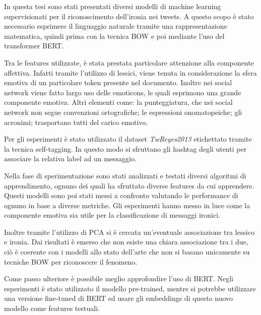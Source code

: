 \documentclass[oneside]{book}
\begin{document}
In questa tesi sono stati presentati diversi modelli di machine learning supervisionati per il riconoscimento dell'ironia nei tweets. A questo scopo è stato necessario esprimere il linguaggio naturale tramite una rappresentazione matematica, quindi prima con la tecnica BOW e poi mediante l'uso del transformer BERT.

Tra le features utilizzate, è stata prestata particolare attenzione alla componente affettiva. Infatti tramite l'utilizzo di lessici, viene tenuta in considerazione la sfera emotiva di un particolare token presente nel documento. Inoltre nei social network viene fatto largo uso delle emoticons, le quali esprimono una grande componente emotiva. Altri elementi come: la punteggiatura, che nei social network non segue convenzioni ortografiche; le espressioni onomatopeiche; gli acronimi; trasportano tutti del carico emotivo.

Per gli esperimenti è stato utilizzato il dataset \textit{TwReyes2013} etichettato tramite la tecnica self-tagging. In questo modo si sfruttano gli hashtag degli utenti per associare la relativa label ad un messaggio.


Nella fase di sperimentazione sono stati analizzati e testati diversi algoritmi di apprendimento, ognuno dei quali ha sfruttato diverse features da cui apprendere. Questi modelli sono poi stati messi a confronto valutando le performance di ognuno in base a diverse metriche. Gli esperimenti hanno messo in luce come la componente emotiva sia utile per la classificazione di messaggi ironici. 

Inoltre tramite l'utilizzo di PCA si è cercata un'eventuale associazione tra lessico e ironia. Dai risultati è emerso che non esiste una chiara associazione tra i due, ciò è coerente con i modelli allo stato dell'arte che non si basano unicamente su tecniche BOW per riconoscere il fenomeno.

Come passo ulteriore è possibile meglio approfondire l'uso di BERT. Negli esperimenti è stato utilizzato il modello pre-trained, mentre si potrebbe utilizzare una versione fine-tuned di BERT ed usare gli embeddings di questo nuovo modello come features testuali.





\end{document}
